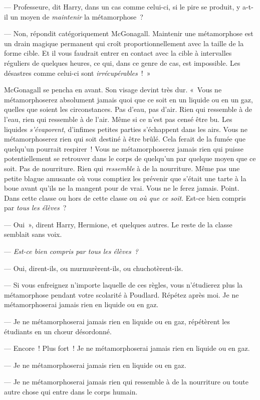 --- Professeure, dit Harry, dans un cas comme celui-ci, si le pire se produit, y a-t-il un moyen de \emph{maintenir} la métamorphose~?

--- Non, répondit catégoriquement McGonagall.
Maintenir une métamorphose est un drain magique permanent qui croît proportionnellement avec la taille de la forme cible.
Et il vous faudrait entrer en contact avec la cible à intervalles réguliers de quelques heures, ce qui, dans ce genre de cas, est impossible.
Les désastres comme celui-ci sont \emph{irrécupérables}~!~»

McGonagall se pencha en avant. Son visage devint très dur.
«~Vous ne métamorphoserez absolument jamais quoi que ce soit en un liquide ou en un gaz, quelles que soient les circonstances.
Pas d'eau, pas d'air.
Rien qui ressemble à de l'eau, rien qui ressemble à de l'air.
Même si ce n'est pas censé être bu.
Les liquides \emph{s'évaporent}, d'infimes petites parties s'échappent dans les airs.
Vous ne métamorphoserez rien qui soit destiné à être brûlé.
Cela ferait de la fumée que quelqu'un pourrait respirer~!
Vous ne métamorphoserez jamais rien qui puisse potentiellement se retrouver dans le corps de quelqu'un par quelque moyen que ce soit.
Pas de nourriture.
Rien qui \emph{ressemble} à de la nourriture.
Même pas une petite blague amusante où vous comptiez les prévenir que s'était une tarte à la boue avant qu'ils ne la mangent pour de vrai.
Vous ne le ferez jamais.
Point.
Dans cette classe ou hors de cette classe ou \emph{où que ce soit}.
Est-ce bien compris par \emph{tous les élèves}~?

--- Oui~», dirent Harry, Hermione, et quelques autres. Le reste de la classe semblait sans voix.

--- \emph{Est-ce bien compris par tous les élèves~?}

--- Oui, dirent-ils, ou murmurèrent-ils, ou chuchotèrent-ils.

--- Si vous enfreignez n'importe laquelle de ces règles, vous n'étudierez plus la métamorphose pendant votre scolarité à Poudlard.
Répétez après moi.
Je ne métamorphoserai jamais rien en liquide ou en gaz.

--- Je ne métamorphoserai jamais rien en liquide ou en gaz, répétèrent les étudiants en un chœur désordonné.

--- Encore~! Plus fort~! Je ne métamorphoserai jamais rien en liquide ou en gaz.

--- Je ne métamorphoserai jamais rien en liquide ou en gaz.

--- Je ne métamorphoserai jamais rien qui ressemble à de la nourriture ou toute autre chose qui entre dans le corps humain.

